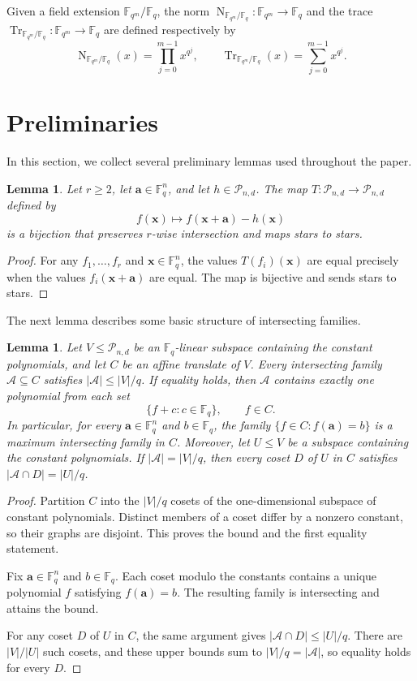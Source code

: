 \documentclass[12pt,reqno]{amsart}
\newtheorem{lem}[thm]{Lemma}
\theoremstyle{definition}
\newcommand{\Nm}{\operatorname{N}}
\newcommand{\F}{\mathbb{F}}
\newcommand{\cA}{\mathcal A}
\newcommand{\cP}{\mathcal P}
\begin{document}
Given a field extension $\F_{q^m}/\F_q$, the norm $\Nm_{\F_{q^m}/\F_q}\colon \F_{q^m}\to \F_q$ and the trace $\operatorname{Tr}_{\F_{q^m}/\F_q}\colon \F_{q^m}\to \F_q$ are defined respectively by
\begin{equation*}
\Nm_{\F_{q^m}/\F_q}(x)=\prod_{j=0}^{m-1} x^{q^j},
\qquad \operatorname{Tr}_{\F_{q^m}/\F_q} (x)=\sum_{j=0}^{m-1} x^{q^j}.
\end{equation*}

\section{Preliminaries}\label{sec:preliminaries}

In this section, we collect several preliminary lemmas used throughout the paper.

\begin{lem}\label{lem:normalization}
Let $r\geq2$, let $\mathbf a\in \F_q^n$, and let $h\in\cP_{n,d}$. The map $T\colon\cP_{n,d}\to\cP_{n,d}$ defined by
\[
f(\mathbf x) \mapsto f(\mathbf x+\mathbf a)-h(\mathbf x)
\]
is a bijection that preserves $r$-wise intersection and maps stars
to stars.
\end{lem}

\begin{proof}
For any $f_1,\ldots,f_r$ and $\mathbf x\in\F_q^n$, the values
$T(f_i)(\mathbf x)$ are equal precisely when the values
$f_i(\mathbf x+\mathbf a)$ are equal. The map is bijective and sends
stars to stars.
\end{proof}

The next lemma describes some basic structure of intersecting families.

\begin{lem}\label{lem:transversal}
Let $V\leq\cP_{n,d}$ be an $\F_q$-linear subspace containing the
constant polynomials, and let $C$ be an affine translate of $V$. Every
intersecting family $\cA\subseteq C$ satisfies $|\cA|\leq |V|/q$. If equality holds, then $\cA$ contains exactly one polynomial from
each set
\[
\{f+c:c\in\F_q\},\qquad f\in C.
\]
In particular, for every $\mathbf a\in\F_q^n$ and $b\in\F_q$, the
family $\{f\in C:f(\mathbf a)=b\}$
is a maximum intersecting family in $C$. Moreover, let $U\leq V$ be a subspace containing the constant polynomials. If
$|\cA|=|V|/q$, then every coset $D$ of $U$ in $C$ satisfies $|\cA\cap D|=|U|/q$.
\end{lem}

\begin{proof}
Partition $C$ into the $|V|/q$ cosets of the one-dimensional subspace
of constant polynomials. Distinct members of a coset differ by a
nonzero constant, so their graphs are disjoint. This proves the bound
and the first equality statement.

Fix $\mathbf a\in\F_q^n$ and $b\in\F_q$. Each coset modulo the
constants contains a unique polynomial $f$ satisfying
$f(\mathbf a)=b$. The resulting family is intersecting and attains
the bound.

For any coset $D$ of $U$ in $C$, the same argument gives $|\cA\cap D|\leq |U|/q$. There are $|V|/|U|$ such cosets, and these
upper bounds sum to $|V|/q=|\cA|$, so equality holds for every $D$.
\end{proof}
\end{document}
